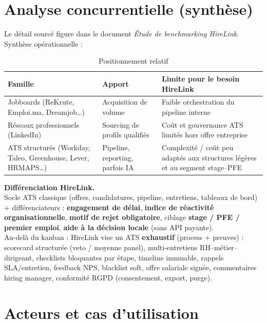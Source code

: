 \documentclass[12pt,a4paper,oneside]{report}
\begin{document}
\chapter{Analyse concurrentielle (synthèse)}
\label{ch:concurrentiel}

Le détail sourcé figure dans le document \textit{Étude de benchmarking HireLink}. Synthèse opérationnelle :

\begin{table}[H]
\centering
\caption{Positionnement relatif}
\small
\begin{tabularx}{\textwidth}{@{}lXX@{}}
\toprule
\textbf{Famille} & \textbf{Apport} & \textbf{Limite pour le besoin HireLink} \\
\midrule
Jobboards (ReKrute, Emploi.ma, Dreamjob\ldots) & Acquisition de volume~\cite{africawork-top7} & Faible orchestration du pipeline interne \\
Réseaux professionnels (LinkedIn) & Sourcing de profils qualifiés~\cite{africawork-ats} & Coût et gouvernance ATS limités hors offre entreprise \\
ATS structurés (Workday, Taleo, Greenhouse, Lever, HRMAPS\ldots) & Pipeline, reporting, parfois IA~\cite{africawork-ats,cbo-hrmaps} & Complexité / coût peu adaptés aux structures légères et au segment stage--PFE \\
\bottomrule
\end{tabularx}
\end{table}

\begin{objectifbox}
\textbf{Différenciation HireLink.}\\
Socle ATS classique (offres, candidatures, pipeline, entretiens, tableaux de bord) + différenciateurs : \textbf{engagement de délai}, \textbf{indice de réactivité organisationnelle}, \textbf{motif de rejet obligatoire}, ciblage \textbf{stage / PFE / premier emploi}, \textbf{aide à la décision locale} (sans API payante).\\[0.4em]
Au-delà du kanban : HireLink vise un ATS \textbf{exhaustif} (process + preuves) : scorecard structurée (veto / moyenne panel), multi-entretiens RH--métier--dirigeant, checklists bloquantes par étape, timeline immuable, rappels SLA/entretien, feedback NPS, blacklist soft, offre salariale signée, commentaires hiring manager, conformité RGPD (consentement, export, purge).
\end{objectifbox}

\chapter{Acteurs et cas d'utilisation}
\label{ch:uc}
\end{document}
